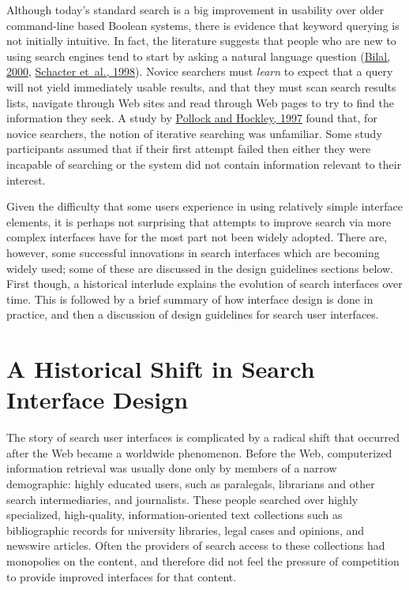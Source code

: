 \documentclass[sigconf,nonacm,screen,pbalance]{acmart}
\begin{document}
Although today's standard search is a big improvement in usability over older command-line based Boolean
systems, there is evidence that keyword querying is not initially intuitive. In fact, the literature
suggests that people who are new to using search engines tend to start by asking a natural language question
(\href{https://searchuserinterfaces.com/book/sui_references.html#bilal2000c}{Bilal, 2000}, \href{https://searchuserinterfaces.com/book/sui_references.html#schacter1998csi}{ Schacter et~al., 1998}). Novice searchers must {\em  learn} to expect that a query
will not yield immediately usable results, and that they must scan search results lists, navigate through
Web sites and read through Web pages to try to find the information they seek. A study by \href{https://searchuserinterfaces.com/book/sui_references.html#pollock1997swi}{Pollock and Hockley, 1997} found that, for novice searchers, the notion of iterative searching was
unfamiliar. Some study participants assumed that if their first attempt failed then either they were
incapable of searching or the system did not contain information relevant to their interest.

Given the difficulty that some users experience in using relatively simple interface elements, it is
perhaps not surprising that attempts to improve search via more complex interfaces have for the most part
not been widely adopted. There are, however, some successful innovations in search interfaces which are
becoming widely used; some of these are discussed in the design guidelines sections below. First though, a
historical interlude explains the evolution of search interfaces over time. This is followed by a brief
summary of how interface design is done in practice, and then a discussion of design guidelines for search
user interfaces.

\section{A Historical Shift in Search Interface Design}

The story of search user interfaces is complicated by a radical shift that occurred after the Web became a
worldwide phenomenon. Before the Web, computerized information retrieval was usually done only by members
of a narrow demographic: highly educated users, such as paralegals, librarians and other search
intermediaries, and journalists. These people searched over highly specialized, high-quality,
information-oriented text collections such as bibliographic records for university libraries, legal cases
and opinions, and newswire articles. Often the providers of search access to these collections had
monopolies on the content, and therefore did not feel the pressure of competition to provide improved
interfaces for that content.
\end{document}
